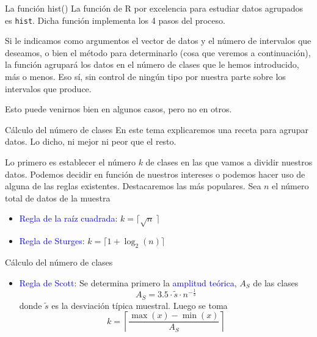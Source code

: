 \documentclass[
  ignorenonframetext,
  aspectratio=169]{beamer}
\providecommand{\tightlist}{%
  \setlength{\itemsep}{0pt}\setlength{\parskip}{0pt}}
\newcommand\blue[1]{\textcolor{blue}{#1}}
\begin{document}
\begin{frame}[fragile]{La función hist()}
\protect\hypertarget{la-funciuxf3n-hist}{}
La función de R por excelencia para estudiar datos agrupados es
\texttt{hist}. Dicha función implementa los 4 pasos del proceso.

Si le indicamos como argumentos el vector de datos y el número de
intervalos que deseamos, o bien el método para determinarlo (cosa que
veremos a continuación), la función agrupará los datos en el número de
clases que le hemos introducido, más o menos. Eso sí, sin control de
ningún tipo por nuestra parte sobre los intervalos que produce.

Esto puede venirnos bien en algunos casos, pero no en otros.
\end{frame}

\begin{frame}{Cálculo del número de clases}
\protect\hypertarget{cuxe1lculo-del-nuxfamero-de-clases}{}
En este tema explicaremos una receta para agrupar datos. Lo dicho, ni
mejor ni peor que el resto.

Lo primero es establecer el número \(k\) de clases en las que vamos a
dividir nuestros datos. Podemos decidir en función de nuestros intereses
o podemos hacer uso de alguna de las reglas existentes. Destacaremos las
más populares. Sea \(n\) el número total de datos de la muestra

\begin{itemize}
\tightlist
\item
  \blue{Regla de la raíz cuadrada}: \(k = \lceil\sqrt{n}\ \rceil\)
\item
  \blue{Regla de Sturges}: \(k = \lceil 1+\log_{2}(n)\rceil\)
\end{itemize}
\end{frame}

\begin{frame}{Cálculo del número de clases}
\protect\hypertarget{cuxe1lculo-del-nuxfamero-de-clases-1}{}
\begin{itemize}
\tightlist
\item
  \blue{Regla de Scott}: Se determina primero la
  \blue{amplitud teórica}, \(A_S\) de las clases
  \[A_S = 3.5\cdot\tilde{s}\cdot n^{-\frac{1}{3}}\] donde \(\tilde{s}\)
  es la desviación típica muestral. Luego se toma
  \[k = \left\lceil \frac{\max(x)-\min(x)}{A_S}\right\rceil\]
\end{itemize}
\end{frame}
\end{document}
